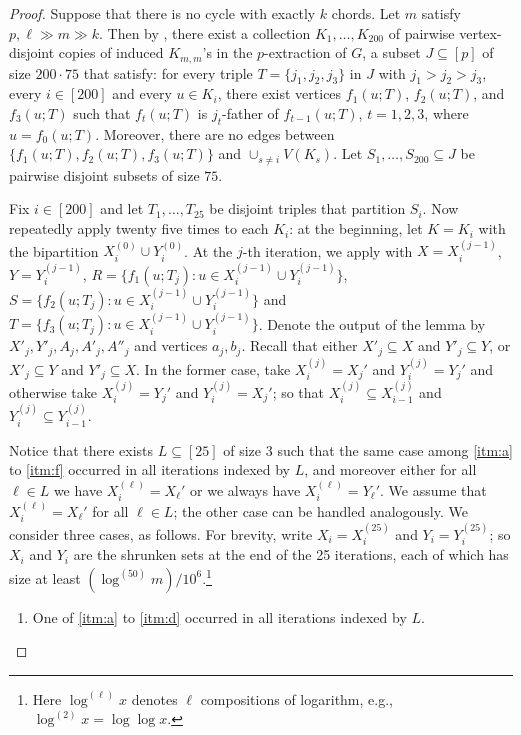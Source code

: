 \documentclass[10pt,a4paper]{amsart}
\theoremstyle{plain}
\theoremstyle{definition}
\begin{document}
    \begin{proof}
        Suppose that there is no cycle with exactly $k$ chords. 
        Let $m$ satisfy $p, \ell \gg m \gg k$. 
        Then by , there exist a collection $K_1, \ldots, K_{200}$ of pairwise vertex-disjoint copies of induced $K_{m,m}$'s in the $p$-extraction of $G$, a subset $J \subseteq [p]$ of size $200 \cdot 75$ that satisfy:
        for every triple $T=\{j_1,j_2,j_3\}$ in $J$ with $j_1>j_2>j_3$, every $i\in[200]$ and every $u\in K_i$,
        there exist vertices $f_{1}(u;T)$, $f_{2}(u;T)$,  and $f_{3}(u;T)$
        such that $f_t(u;T)$ is $j_t$-father of $f_{t-1}(u;T)$, $t=1,2,3$, where $u=f_0(u;T)$. Moreover, there are no edges between $\{f_{1}(u;T),f_{2}(u;T),f_{3}(u;T)\}$ and $\cup_{s\neq i}V(K_s)$.
        Let $S_1, \ldots, S_{200}\subseteq J$ be pairwise disjoint subsets of size $75$.

        Fix $i \in [200]$ and let $T_{1}, \ldots, T_{25}$ be disjoint triples that partition $S_i$. Now repeatedly apply  twenty five times to each $K_i$: at the beginning, let $K=K_i$ with the bipartition $X_i^{(0)}\cup Y_i^{(0)}$. At the $j$-th iteration, we apply  with $X=X_i^{(j-1)}$, $Y=Y_i^{(j-1)}$, $R=\{f_{1}(u;T_j) : u \in X_i^{(j-1)} \cup Y_i^{(j-1)}\}$, $S=\{f_{2}(u;T_j) : u \in X_i^{(j-1)} \cup Y_i^{(j-1)}\}$ and $T=\{f_{3}(u;T_j) : u \in X_i^{(j-1)} \cup Y_i^{(j-1)}\}$.
        Denote the output of the lemma by $X'_{j}, Y'_{j}, A_{j}, A'_{j}, A''_{j}$ and vertices $a_{j},b_{j}$. Recall that either $X'_{j} \subseteq X$ and $Y'_{j} \subseteq Y$, or $X'_{j} \subseteq Y$ and $Y'_{j} \subseteq X$.
        In the former case, take $X_i^{(j)} = X_{j}'$ and $Y_i^{(j)} = Y_{j}'$ and otherwise take $X_i^{(j)} = Y_{j}'$ and $Y_i^{(j)} = X_{j}'$; so that $X_i^{(j)} \subseteq X_{i-1}^{(j)}$ and $Y_i^{(j)} \subseteq Y_{i-1}^{(j)}$. 

        Notice that there exists $L \subseteq [25]$ of size $3$ such that the same case among \ref{itm:a} to \ref{itm:f} occurred in all iterations indexed by $L$, and moreover either for all $\ell \in L$ we have $X_i^{(\ell)} = X_{\ell}'$ or we always have $X_i^{(\ell)} = Y_{\ell}'$.
		We assume that $X_i^{(\ell)} = X_\ell'$ for all $\ell \in L$; the other case can be handled analogously.
		We consider three cases, as follows.
        For brevity, write $X_i = X_i^{(25)}$ and $Y_i = Y_i^{(25)}$; so $X_i$ and $Y_i$ are the shrunken sets at the end of the 25 iterations, each of which has size at least $(\log ^{(50)} m) / 10^6$.\footnote{Here 
        $\log ^{(\ell)} x$ denotes $\ell$ compositions of logarithm, e.g., $\log^{(2)}x = \log\log x$.}
        \begin{enumerate} [label = \rm(\arabic*)]
            \item \label{itm:easy-case}
				One of \ref{itm:a} to \ref{itm:d} occurred in all iterations indexed by $L$.


\end{enumerate}
\end{proof}
\end{document}
